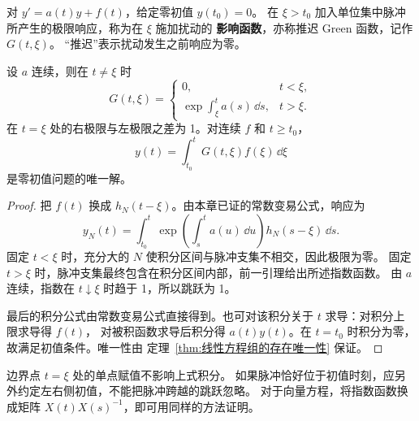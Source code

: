 \begin{definition}[推迟影响函数]
对 $y'=a(t)y+f(t)$，给定零初值 $y(t_0)=0$。
在 $\xi>t_0$ 加入单位集中脉冲所产生的极限响应，称为在 $\xi$ 施加扰动的
\textbf{影响函数}，亦称推迟 Green 函数，记作 $G(t,\xi)$。
“推迟”表示扰动发生之前响应为零。
\end{definition}
\begin{theorem}
设 $a$ 连续，则在 $t\ne\xi$ 时
\[
 G(t,\xi)=
 \begin{cases}
 0,&t<\xi,\\
 \exp\displaystyle\int_\xi^t a(s)\,\dd s,&t>\xi.
 \end{cases}
\]
在 $t=\xi$ 处的右极限与左极限之差为 1。对连续 $f$ 和 $t\geq t_0$，
\[
 y(t)=\int_{t_0}^tG(t,\xi)f(\xi)\,\dd\xi
\]
是零初值问题的唯一解。
\end{theorem}
\begin{proof}
把 $f(t)$ 换成 $h_N(t-\xi)$。由本章已证的常数变易公式，响应为
\[
 y_N(t)=\int_{t_0}^t
 \exp\left(\int_s^t a(u)\,\dd u\right)h_N(s-\xi)\,\dd s.
\]
固定 $t<\xi$ 时，充分大的 $N$ 使积分区间与脉冲支集不相交，因此极限为零。
固定 $t>\xi$ 时，脉冲支集最终包含在积分区间内部，前一引理给出所述指数函数。
由 $a$ 连续，指数在 $t\downarrow\xi$ 时趋于 1，所以跳跃为 1。

最后的积分公式由常数变易公式直接得到。也可对该积分关于 $t$ 求导：对积分上限求导得 $f(t)$，
对被积函数求导后积分得 $a(t)y(t)$。在 $t=t_0$ 时积分为零，故满足初值条件。唯一性由
定理~\ref{thm:线性方程组的存在唯一性} 保证。
\end{proof}
\begin{remark}
边界点 $t=\xi$ 处的单点赋值不影响上式积分。
如果脉冲恰好位于初值时刻，应另外约定左右侧初值，不能把脉冲跨越的跳跃忽略。
对于向量方程，将指数函数换成矩阵 $X(t)X(s)^{-1}$，即可用同样的方法证明。
\end{remark}

